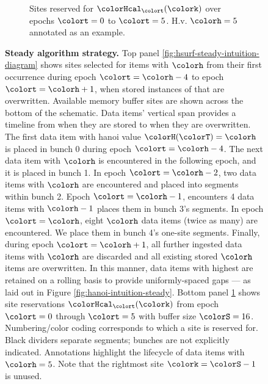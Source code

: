 \begin{figure}[htbp!]
\begin{subfigure}[b]{0.98\linewidth}
\begin{tikzpicture}
    \end{tikzpicture}
    \vspace{-5ex}
    \caption{\footnotesize Sites reserved for \hv{} $\colorHcal_{\colort}(\colork)$ over epochs $\colort=0$ to $\colort=5$. H.v.{} $\colorh=5$ annotated as an example.}
    \label{fig:hsurf-steady-intuition-heatmap}
  \end{subfigure}%
  \vspace{-2ex}
  \caption{
    \textbf{Steady algorithm strategy.}
    \footnotesize
    Top panel \ref{fig:hsurf-steady-intuition-diagram} shows sites selected for items with \hv{} $\colorh$ from their first occurrence during epoch $\colort=\colorh-4$ to epoch $\colort=\colorh+1$, when stored instances of that \hv{} are overwritten.
    Available memory buffer sites are shown across the bottom of the schematic.
    Data items' vertical span provides a timeline from when they are stored to when they are overwritten.
    The first data item with hanoi value $\colorH(\colorT) = \colorh$ is placed in bunch 0 during epoch $\colort=\colorh-4$.
    The next data item with \hv{} $\colorh$ is encountered in the following epoch, and it is placed in bunch 1.
    In epoch $\colort=\colorh-2$, two data items with \hv{} $\colorh$ are encountered and placed into segments within bunch 2.
    Epoch $\colort=\colorh-1$, encounters 4 data items with \hv{} $\colorh-1$ places them in bunch 3's segments.
    In epoch $\colort=\colorh$, eight \hv{} $\colorh$ data items (twice as many) are encountered.
    We place them in bunch 4's one-site segments.
    Finally, during epoch $\colort=\colorh+1$, all further ingested data items with \hv{} $\colorh$ are discarded and all existing stored \hv{} $\colorh$ items are overwritten.
    In this manner, data items with highest \hv{} are retained on a rolling basis to provide uniformly-spaced gaps --- as laid out in Figure \ref{fig:hanoi-intuition-steady}.
    Bottom panel \ref{fig:hsurf-steady-intuition-heatmap} shows \hv{} site reservations $\colorHcal_{\colort}(\colork)$ from epoch $\colort=0$ through $\colort=5$ with buffer size $\colorS=16$.
    Numbering/color coding corresponds to which \hv{} a site is reserved for.
    Black dividers separate segments; bunches are not explicitly indicated.
    Annotations highlight the lifecycle of data items with \hv{} $\colorh=5$.
    Note that the rightmost site $\colork=\colorS-1$ is unused.
  }
  \label{fig:hsurf-steady-intuition}
\end{figure}
